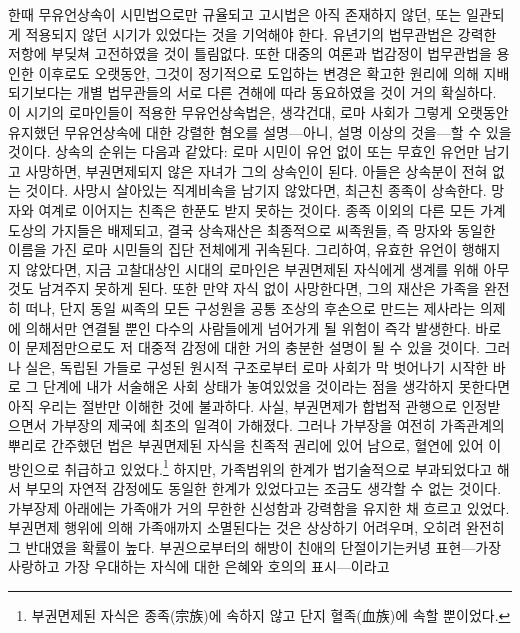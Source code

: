 한때 무유언상속이 시민법으로만 규율되고
고시법은 아직 존재하지 않던, 또는 일관되게 적용되지 않던
시기가 있었다는 것을 기억해야 한다.
유년기의 법무관법은 강력한 저항에 부딪쳐 고전하였을 것이 틀림없다.
또한
대중의 여론과 법감정이 법무관법을 용인한 이후로도 오랫동안,
그것이 정기적으로 도입하는 변경은
확고한 원리에 의해 지배되기보다는
개별 법무관들의 서로 다른 견해에 따라 동요하였을 것이 거의 확실하다.
이 시기의 로마인들이 적용한 무유언상속법은, 생각건대,
로마 사회가 그렇게 오랫동안 유지했던 무유언상속에 대한 강렬한 혐오를
설명---아니, 설명 이상의 것을---할 수 있을 것이다.
상속의 순위는 다음과 같았다:
로마 시민이 유언 없이 또는 무효인 유언만 남기고 사망하면,
부권면제되지 않은 자녀가 그의 상속인이 된다.
 아들은 상속분이 전혀 없는 것이다.
사망시 살아있는 직계비속을 남기지 않았다면,
최근친 종족이 상속한다.
망자와  여계로 이어지는 친족은
한푼도 받지 못하는 것이다.
종족 이외의 다른 모든 가계도상의 가지\hanja{[枝]}들은 배제되고,
결국 상속재산은 최종적으로 씨족원들, 즉
망자와 동일한 이름을 가진 로마 시민들의 집단 전체에게 귀속된다.
그리하여, 유효한 유언이 행해지지 않았다면,
지금 고찰대상인 시대의 로마인은 부권면제된 자식에게 생계를 위해
아무 것도 남겨주지 못하게 된다.
또한 만약 자식 없이 사망한다면,
그의 재산은 가족을 완전히 떠나, 단지
동일 씨족의 모든 구성원을 공통 조상의 후손으로 만드는
제사라는 의제에 의해서만 연결될 뿐인
다수의 사람들에게 넘어가게 될 위험이 즉각 발생한다.
바로 이 문제점만으로도 저 대중적 감정에 대한 거의 충분한 설명이
될 수 있을 것이다.
그러나 실은,
독립된 가들로 구성된 원시적 구조로부터
로마 사회가 막 벗어나기 시작한 바로 그 단계에
내가 서술해온 사회 상태가
놓여있었을 것이라는 점을
생각하지 못한다면
아직 우리는 절반만 이해한 것에 불과하다.
사실,
부권면제가 합법적 관행으로 인정받으면서
가부장의 제국에
최초의 일격이 가해졌다.
그러나 가부장을 여전히 가족관계의 뿌리로 간주했던 법은
부권면제된 자식을 친족적 권리에 있어 남으로,
혈연에 있어 이방인으로 취급하고 있었다.\footnote{부권면제된 자식은
  종족(宗族)에 속하지 않고 단지 혈족(血族)에 속할 뿐이었다.}
하지만, 가족범위의 한계가 법기술적으로 부과되었다고 해서
부모의 자연적 감정에도 동일한 한계가 있었다고는 조금도 생각할 수 없는 것이다.
가부장제 아래에는
가족애가 거의 무한한 신성함과 강력함을 유지한 채
흐르고 있었다.
부권면제 행위에 의해 가족애까지 소멸된다는 것은
상상하기 어려우며, 오히려 완전히 그 반대였을 확률이 높다.
부권으로부터의 해방이 친애의 단절이기는커녕
표현---가장 사랑하고 가장 우대하는 자식에 대한 은혜와 호의의 표시---이라고
